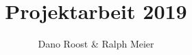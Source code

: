 




\title{Projektarbeit 2019}
\author{Dano Roost & Ralph Meier}


\setcounter{page}{1}
%



% 

\tableofcontents
\newpage









 






